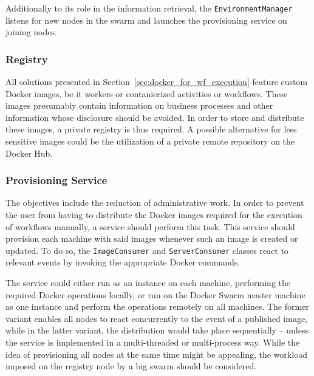     Additionally to its role in the information retrieval, the \texttt{EnvironmentManager} listens for new nodes in the swarm and launches the provisioning service on joining nodes.

  \subsubsection{Registry} %
  \label{subs:registry}
    All solutions presented in Section~\ref{sec:docker_for_wf_execution} feature custom Docker images, be it workers or contanierized activities or workflows. These images presumably contain information on business processes and other information whose disclosure should be avoided.  In order to store and distribute these images, a private registry is thus required. A possible alternative for less sensitive images could be the utilization of a private remote repository on the Docker Hub.

  \subsubsection{Provisioning Service} %
    \label{subs:provisioning_service}
    The objectives include the reduction of administrative work. In order to prevent the user from having to distribute the Docker images required for the execution of workflows manually, a service should perform this task. This service should provision each machine with said images whenever such an image is created or updated. To do so, the \texttt{ImageConsumer} and \texttt{ServerConsumer} classes react to relevant events by invoking the appropriate Docker commands.

    The service could either run as an instance on each machine, performing the required Docker operations locally, or run on the Docker Swarm master machine as one instance and perform the operations remotely on all machines. The former variant enables all nodes to react concurrently to the event of a published image, while in the latter variant, the distribution would take place sequentially -- unless the service is implemented in a multi-threaded or multi-process way. While the idea of provisioning all nodes at the same time might be appealing, the workload imposed on the registry node by a big swarm should be considered.

